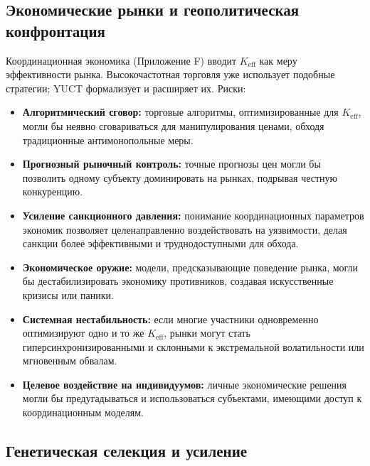 \documentclass[12pt,a4paper]{article}
\theoremstyle{remark}
\newcommand{\Keff}{K_{\mathrm{eff}}}
\begin{document}
	\subsection{Экономические рынки и геополитическая конфронтация}
	\label{subsec:econ}
	
	Координационная экономика (Приложение F) вводит \(\Keff\) как меру эффективности рынка. Высокочастотная торговля уже использует подобные стратегии; YUCT формализует и расширяет их. Риски:
	\begin{itemize}[leftmargin=*]
		\item \textbf{Алгоритмический сговор:} торговые алгоритмы, оптимизированные для \(\Keff\), могли бы неявно сговариваться для манипулирования ценами, обходя традиционные антимонопольные меры.
		\item \textbf{Прогнозный рыночный контроль:} точные прогнозы цен могли бы позволить одному субъекту доминировать на рынках, подрывая честную конкуренцию.
		\item \textbf{Усиление санкционного давления:} понимание координационных параметров экономик позволяет целенаправленно воздействовать на уязвимости, делая санкции более эффективными и труднодоступными для обхода.
		\item \textbf{Экономическое оружие:} модели, предсказывающие поведение рынка, могли бы дестабилизировать экономику противников, создавая искусственные кризисы или паники.
		\item \textbf{Системная нестабильность:} если многие участники одновременно оптимизируют одно и то же \(\Keff\), рынки могут стать гиперсинхронизированными и склонными к экстремальной волатильности или мгновенным обвалам.
		\item \textbf{Целевое воздействие на индивидуумов:} личные экономические решения могли бы предугадываться и использоваться субъектами, имеющими доступ к координационным моделям.
	\end{itemize}
	
	\subsection{Генетическая селекция и усиление}
	\label{subsec:genetic}
	
\end{document}
